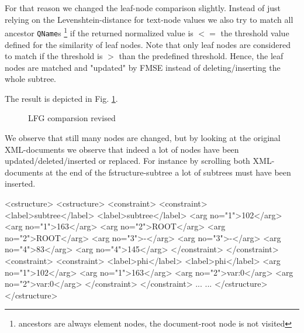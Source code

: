 For that reason we changed the leaf-node comparison slightly. Instead of just relying on the Levenshtein-distance for text-node values we also try to match all ancestor \texttt{QName}s \footnote{ancestors are always element nodes, the document-root node is not visited} if the returned normalized value is $<=$ the threshold value defined for the similarity of leaf nodes. Note that only leaf nodes are considered to match if the threshold is $>$ than the predefined threshold. Hence, the leaf nodes are matched and "updated" by FMSE instead of deleting/inserting the whole subtree.

The result is depicted in Fig. \ref{fig:linguistics}.

\begin{figure}[tb]
\caption{\label{fig:linguistics} LFG comparsion revised}
\end{figure}

We observe that still many nodes are changed, but by looking at the original XML-documents we observe that indeed a lot of nodes have been updated/deleted/inserted or replaced. For instance by scrolling both XML-documents at the end of the fstructure-subtree a lot of subtrees must have been inserted.

\begin{code}[caption=CStructure/FStructure comparsion]
<cstructure>                   <cstructure>
  <constraint>                   <constraint>
    <label>subtree</label>         <label>subtree</label>
    <arg no="1">102</arg>          <arg no="1">163</arg>
    <arg no="2">ROOT</arg>         <arg no="2">ROOT</arg>   
    <arg no="3">-</arg>            <arg no="3">-</arg>
    <arg no="4">83</arg>           <arg no="4">145</arg>
  </constraint>                  </constraint>
  <constraint>                   <constraint>
    <label>phi</label>             <label>phi</label>
    <arg no="1">102</arg>          <arg no="1">163</arg>
    <arg no="2">var:0</arg>        <arg no="2">var:0</arg>
  </constraint>                  </constraint>
  ...                            ...
</cstructure>                  </cstructure>
\end{code}
\label{lst:linguistscomparsion}

